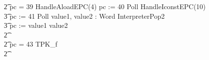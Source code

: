 \begin{figure}[t]
\begin{circus}
    \t2 {} \circelse pc = 39 \circthen HandleAloadEPC(4) \circseq pc := 40 \circseq Poll \circseq HandleIconstEPC(10) \circseq \\
    \t3 pc := 41 \circseq Poll \circseq \circvar value1, value2 : Word \circspot InterpreterPop2 \circseq \\
    \t3 pc := \IF value1 \leq value2   \\
    \t2 {} \cdots {} \\
    \t2 {} \circelse pc = 43 \circthen TPK\_f \\
    \t2 {} \cdots {} \\

\end{circus}
\end{figure}
